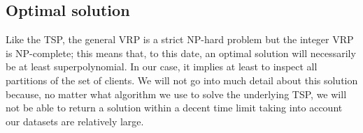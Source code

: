 \subsection{Optimal solution} \label{algorithm-vrp-optimal}
Like the \acrshort*{TSP}, the general \acrshort*{VRP} is a strict NP-hard problem but the integer \acrshort*{VRP} is NP-complete; this means that, to this date, an optimal solution will necessarily be at least superpolynomial. In our case, it implies at least to inspect all partitions of the set of clients. We will not go into much detail about this solution because, no matter what algorithm we use to solve the underlying \acrshort*{TSP}, we will not be able to return a solution within a decent time limit taking into account our datasets are relatively large.
